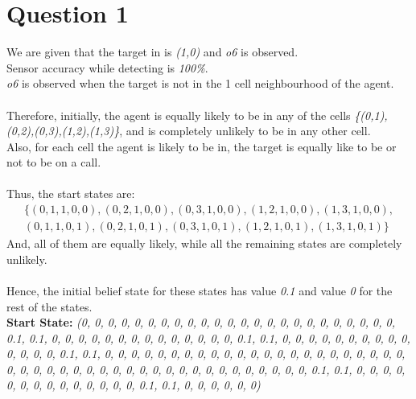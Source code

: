 \documentclass[12pt]{report}
\theoremstyle{definition}
\theoremstyle{plain}
\begin{document}
\section*{Question 1}
We are given that the target in is \emph{(1,0)} and \emph{o6} is observed. \\
Sensor accuracy while detecting  is \emph{100\%}. \\
\emph{o6} is observed when the target is not in the 1 cell neighbourhood of the agent. \\ \\
Therefore, initially, the agent is equally likely to be in any of the cells \emph{\{(0,1),(0,2),(0,3),(1,2),(1,3)\}}, and is completely unlikely to be in any other cell. \\
Also, for each cell the agent is likely to be in, the target is equally like to be or not to be on a call. \\ \\
Thus, the start states are:
\begin{multline*}
\{(0,1,1,0,0),(0,2,1,0,0),(0,3,1,0,0),(1,2,1,0,0),(1,3,1,0,0),\\(0,1,1,0,1),(0,2,1,0,1), (0,3,1,0,1),(1,2,1,0,1),(1,3,1,0,1)\}
\end{multline*}
And, all of them are equally likely, while all the remaining states are completely unlikely. \\ \\
Hence, the initial belief state for these states has value \emph{0.1} and value \emph{0} for the rest of the states. \\
\textbf{Start State:} \emph{(0, 0, 0, 0, 0, 0, 0, 0, 0, 0, 0, 0, 0, 0, 0, 0, 0, 0, 0, 0, 0, 0, 0, 0, 0.1, 0.1, 0, 0, 0, 0, 0, 0, 0, 0, 0, 0, 0, 0, 0, 0, 0.1, 0.1, 0, 0, 0, 0, 0, 0, 0, 0, 0, 0, 0, 0, 0, 0, 0.1, 0.1, 0, 0, 0, 0, 0, 0, 0, 0, 0, 0, 0, 0, 0, 0, 0, 0, 0, 0, 0, 0, 0, 0, 0, 0, 0, 0, 0, 0, 0, 0, 0, 0, 0, 0, 0, 0, 0, 0, 0, 0, 0, 0, 0, 0, 0, 0, 0.1, 0.1, 0, 0, 0, 0, 0, 0, 0, 0, 0, 0, 0, 0, 0, 0, 0.1, 0.1, 0, 0, 0, 0, 0, 0)} 
\vspace{0.2cm} \\ \hline
\pagebreak
\end{document}

